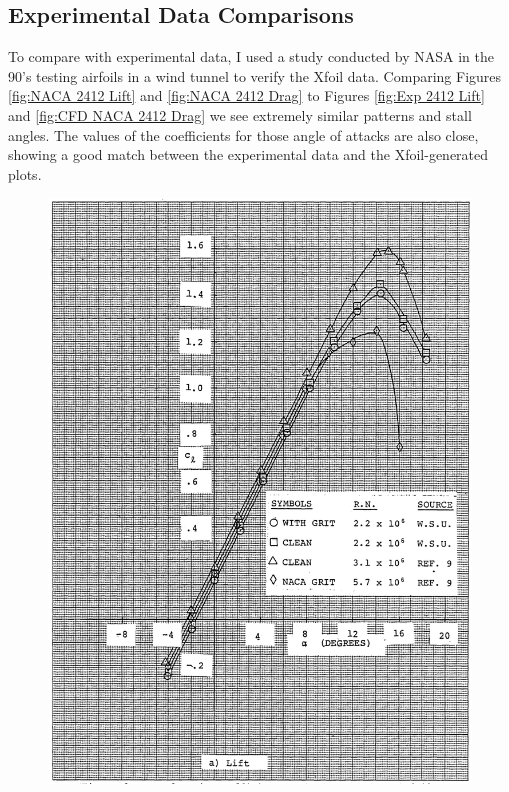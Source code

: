\documentclass{article}
\begin{document}
\subsection{Experimental Data Comparisons}

To compare with experimental data, I used a study conducted by NASA \cite{anderson1994simplified} in the 90's testing airfoils in a wind tunnel to verify the Xfoil data. Comparing Figures \ref{fig:NACA 2412 Lift} and \ref{fig:NACA 2412 Drag} to Figures \ref{fig:Exp 2412 Lift} and \ref{fig:CFD NACA 2412 Drag} we see extremely similar patterns and stall angles. The values of the coefficients for those angle of attacks are also close, showing a good match between the experimental data and the Xfoil-generated plots.

\begin{figure}[h]
    \centering
\begin{minipage}[b]{0.3\textwidth}
\centering
\includegraphics[width=\textwidth]{Screenshot 2024-09-10 at 10.59.39 PM.png}

\end{minipage}
\end{figure}
\end{document}
